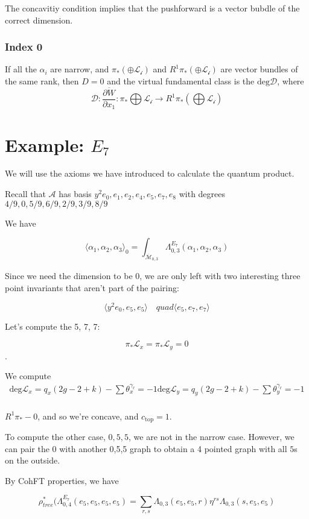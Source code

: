 \documentclass{amsart}
\theoremstyle{definition}
\newcommand{\Mbar}{\overline{\mathcal{M}}}
\begin{document}
The concavitiy condition implies that the pushforward is a vector bubdle of the correct dimension.

\subsubsection{Index 0}
If all the $\alpha_i$ are narrow, and $\pi_*(\oplus\mathcal{L_i})$ and $R^1\pi_*(\oplus\mathcal{L_i})$ are vector bundles of the same rank, then $D=0$ and the virtual fundamental class is the $\text{deg}\mathcal{D}$, where
$$\mathcal{D}:\frac{\overline{\partial W}}{\partial x_1}:\pi_*\bigoplus \mathcal{L_i}\to R^1\pi_*(\bigoplus\mathcal{L_i})$$

\section{Example: $E_7$}

We will use the axioms we have introduced to  calculate the quantum product.

Recall that $\mathcal{A}$ has basis $y^2e_0,e_1,e_2,e_4,e_5,e_7,e_8$ with degrees
$4/9,0,5/9,6/9,2/9,3/9,8/9$

We have 

$$\langle \alpha_1,\alpha_2,\alpha_3\rangle_0=\int_{\Mbar_{0,3}}\Lambda^{E_7}_{0,3}(\alpha_1,\alpha_2,\alpha_3)$$

Since we need the dimension to be 0, we are only left with two interesting three point invariants that aren't part of the pairing:

$$\langle y^2 e_0, e_5, e_5\rangle\quad quad \langle e_5, e_7, e_7\rangle $$

Let's compute the 5, 7, 7:

$$\pi_*\mathcal{L}_x=\pi_*\mathcal{L}_y=0$$.

We compute
\begin{align*}
\text{deg} \mathcal{L}_x=q_x(2g-2+k)-\sum \theta_x^{\gamma_\ell}=-1
\text{deg} \mathcal{L}_y=q_y(2g-2+k)-\sum \theta_y^{\gamma_\ell}=-1 \\
\end{align*}

$R^1\pi_*-0$, and so we're concave, and $c_{\text{top}}=1$.

To compute the other case, $0,5,5$, we are not in the narrow case.  However, we can pair the 0 with another 0,5,5 graph to obtain a 4 pointed graph with all $5$s on the outside.

By CohFT properties, we have

$$\rho_{tree}^*(\Lambda_{0,4}^{E_7}(e_5,e_5,e_5,e_5)=\sum_{r,s} \Lambda_{0,3}(e_5,e_5,r)\eta^{rs}\Lambda_{0,3}(s,e_5,e_5)$$
\end{document}
